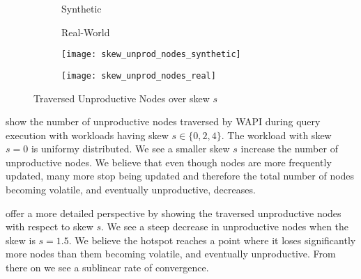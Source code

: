 \documentclass[abstracton,12pt]{scrartcl}
\theoremstyle{definition}
\begin{document}
\begin{figure}[h]
  \centering
  \begin{subfigure}{0.49\linewidth}
    \centering
    Synthetic
  \end{subfigure}
  \begin{subfigure}{0.49\linewidth}
    \centering
    Real-World
  \end{subfigure}
  \begin{subfigure}{0.49\linewidth}
    \centering
    \texttt{[image: skew\_unprod\_nodes\_synthetic]}
    \caption{}
    \label{fig:skew_unprod_nodes_synthetic}
  \end{subfigure}
  \begin{subfigure}{0.49\linewidth}
    \centering
    \texttt{[image: skew\_unprod\_nodes\_real]}
    \caption{}
    \label{fig:skew_unprod_nodes_real}
  \end{subfigure}
  \caption{Traversed Unproductive Nodes over skew $s$}
\end{figure}

 show the number
of unproductive nodes traversed by WAPI during query execution with workloads having skew
$s \in \{0,2,4\}$. The workload with skew $s = 0$ is uniformy distributed. We see a smaller
skew $s$ increase the number of unproductive nodes. We believe that even though nodes are
more frequently updated, many more stop being updated and therefore the total number of nodes
becoming volatile, and eventually unproductive, decreases.

 offer a more detailed
perspective by showing the traversed unproductive nodes with respect to skew $s$. We see a
steep decrease in unproductive nodes when the skew is $s=1.5$. We believe the hotspot reaches
a point where it loses significantly more nodes than them becoming volatile, and eventually
unproductive. From there on we see a sublinear rate of convergence. 


\end{document}
